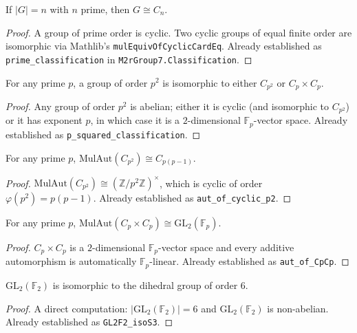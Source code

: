 \begin{lemma}
    \label{lem:prime-classification}
    If $|G| = n$ with $n$ prime, then $G \cong C_n$.
\end{lemma}
\begin{proof}
    A group of prime order is cyclic. Two cyclic groups of equal finite order
    are isomorphic via Mathlib's \texttt{mulEquivOfCyclicCardEq}. Already
    established as \texttt{prime\_classification} in
    \texttt{M2rGroup7.Classification}.
\end{proof}

\begin{lemma}
    \label{lem:p-squared-classification}
    For any prime $p$, a group of order $p^2$ is isomorphic to either
    $C_{p^2}$ or $C_p \times C_p$.
\end{lemma}
\begin{proof}
    Any group of order $p^2$ is abelian; either it is cyclic (and isomorphic
    to $C_{p^2}$) or it has exponent $p$, in which case it is a $2$-dimensional
    $\mathbb{F}_p$-vector space. Already established as
    \texttt{p\_squared\_classification}.
\end{proof}

\begin{lemma}
    \label{lem:aut-cyclic-p2}
    For any prime $p$, $\mathrm{MulAut}(C_{p^2}) \cong C_{p(p-1)}$.
\end{lemma}
\begin{proof}
    $\mathrm{MulAut}(C_{p^2}) \cong (\mathbb{Z}/p^2 \mathbb{Z})^\times$, which is
    cyclic of order $\varphi(p^2) = p(p-1)$. Already established as
    \texttt{aut\_of\_cyclic\_p2}.
\end{proof}

\begin{lemma}
    \label{lem:aut-CpCp}
    For any prime $p$, $\mathrm{MulAut}(C_p \times C_p) \cong
    \mathrm{GL}_2(\mathbb{F}_p)$.
\end{lemma}
\begin{proof}
    $C_p \times C_p$ is a $2$-dimensional $\mathbb{F}_p$-vector space and
    every additive automorphism is automatically $\mathbb{F}_p$-linear.
    Already established as \texttt{aut\_of\_CpCp}.
\end{proof}

\begin{lemma}
    \label{lem:GL2F2-isoS3}
    $\mathrm{GL}_2(\mathbb{F}_2)$ is isomorphic to the dihedral group of order
    $6$.
\end{lemma}
\begin{proof}
    A direct computation: $|\mathrm{GL}_2(\mathbb{F}_2)| = 6$ and
    $\mathrm{GL}_2(\mathbb{F}_2)$ is non-abelian. Already established as
    \texttt{GL2F2\_isoS3}.
\end{proof}

